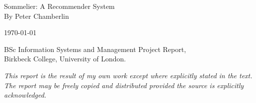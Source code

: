 \begin{titlepage}
    \begin{center}

        { \large Sommelier: A Recommender System}\\[0.4cm]

        { By Peter Chamberlin}

        { \today }

        \vfill

        { BSc Information Systems and Management Project Report, \\
          Birkbeck College, University of London. }

        \vspace{0.4cm}

        \textit{ This report is the result of my own work except where explicitly stated in the text. The report may be freely copied and distributed provided the source is explicitly acknowledged. }

    \end{center}
\end{titlepage}
\date{\today}


